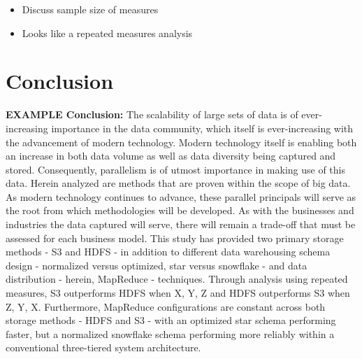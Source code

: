 \documentclass[journal]{IEEEtran}
\begin{document}
	\begin{itemize}
		\item Discuss sample size of measures
		\item Looks like a repeated measures analysis
	\end{itemize}
	
	
	\section{Conclusion}
	
	\textbf{EXAMPLE Conclusion:}
	The scalability of large sets of data is of ever-increasing importance in the data community, which itself is ever-increasing with the advancement of modern technology. Modern technology itself is enabling both an increase in both data volume as well as data diversity being captured and stored. Consequently, parallelism is of utmost importance in making use of this data. Herein analyzed are methods that are proven within the scope of big data. As modern technology continues to advance, these parallel principals will serve as the root from which methodologies will be developed. As with the businesses and industries the data captured will serve, there will remain a trade-off that must be assessed for each business model. This study has provided two primary storage methods - S3 and HDFS - in addition to different data warehousing schema design - normalized versus optimized, star versus snowflake - and data distribution - herein, MapReduce - techniques. Through analysis using repeated measures, S3 outperforms HDFS when X, Y, Z and HDFS outperforms S3 when Z, Y, X. Furthermore, MapReduce configurations are constant across both storage methods - HDFS and S3 - with an optimized star schema performing faster, but a normalized snowflake schema performing more reliably within a conventional three-tiered system architecture.
	
	\ifCLASSOPTIONcaptionsoff
	\newpage
	\fi
	
\end{document}
